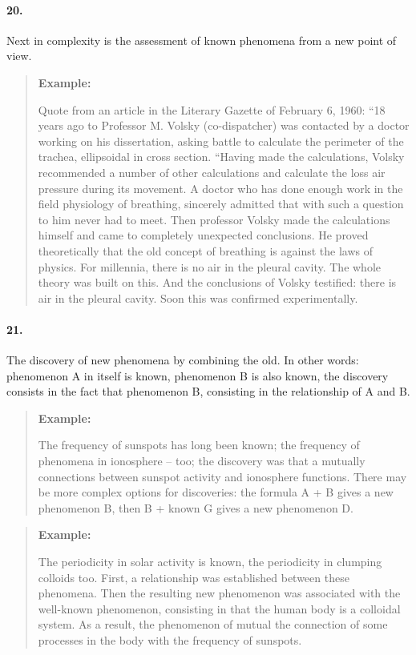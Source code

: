 \documentclass[11pt,a4paper]{article}
\newenvironment{example}{\begin{quote} \textbf{Example:}\par }{\end{quote}}
\begin{document}
\paragraph{20.}
Next in complexity is the assessment of known phenomena from a new point of
view.

\begin{example}
  Quote from an article in the Literary Gazette of February 6, 1960: “18 years
  ago to Professor M. Volsky (co-dispatcher) was contacted by a doctor
  working on his dissertation, asking battle to calculate the perimeter of the
  trachea, ellipsoidal in cross section. “Having made the calculations, Volsky
  recommended a number of other calculations and calculate the loss air
  pressure during its movement. A doctor who has done enough work in the field
  physiology of breathing, sincerely admitted that with such a question to him
  never had to meet. Then professor Volsky made the calculations himself and
  came to completely unexpected conclusions. He proved theoretically that the
  old concept of breathing is against the laws of physics. For millennia,
  there is no air in the pleural cavity. The whole theory was built on this.
  And the conclusions of Volsky testified: there is air in the pleural cavity.
  Soon this was confirmed experimentally.
\end{example}
\paragraph{21.}
The discovery of new phenomena by combining the old. In other words:
phenomenon A in itself is known, phenomenon B is also known, the discovery
consists in the fact that phenomenon B, consisting in the relationship of A
and B.
\begin{example}
  The frequency of sunspots has long been known; the frequency of phenomena in
  ionosphere -- too; the discovery was that a mutually connections between
  sunspot activity and ionosphere functions.  There may be more complex
  options for discoveries: the formula A + B gives a new phenomenon B, then B
  + known G gives a new phenomenon D.
\end{example}

\begin{example}
  The periodicity in solar activity is known, the periodicity in clumping
  colloids too. First, a relationship was established between these phenomena.
  Then the resulting new phenomenon was associated with the well-known
  phenomenon, consisting in that the human body is a colloidal system. As a
  result, the phenomenon of mutual the connection of some processes in the
  body with the frequency of sunspots.
\end{example}
\end{document}
